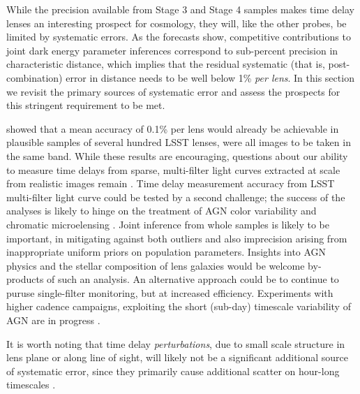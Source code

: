 While the precision available from Stage 3 and Stage 4 samples makes
time delay lenses an interesting prospect for cosmology, they will, like
the other probes, be limited by systematic errors. As the forecasts
show, competitive contributions to joint dark energy parameter
inferences correspond to sub-percent precision in characteristic
distance, which implies that the residual systematic (that is,
post-combination) error in  distance needs to be well below 1\% {\it per
lens}. In this section we revisit the primary sources of systematic
error and  assess the prospects for this stringent requirement to be
met.

\citet{TDC1} showed that a mean accuracy of 0.1\% per lens would already
be achievable in plausible samples of several hundred LSST lenses, were
all images to be taken in the same band.
While these results are encouraging, questions
about our ability to measure time delays from sparse, multi-filter light
curves extracted at scale from realistic images remain
\citep{TCM13}.
Time delay measurement accuracy from  LSST multi-filter
light curve could be tested by a second challenge; the success of the
analyses is likely to hinge on the treatment of AGN color variability
\citep[see e.g.\ ][and references therein]{SunEtal2014}
and chromatic  microelensing
\citep[see e.g.][and references therein]{HainlineEtal2013}.
Joint inference from whole samples is likely to
be important, in mitigating against both outliers and also imprecision
arising from inappropriate uniform priors on  population parameters.
Insights into AGN physics and the stellar composition  of lens galaxies
would be welcome by-products of such an analysis. An alternative approach
could be to continue to puruse single-filter monitoring, but at
increased efficiency. Experiments with higher cadence campaigns,
exploiting the short (sub-day) timescale variability of AGN are in
progress \citep[][F.~Courbin, priv.\ comm.]{BorosonEtal2016}.

It is worth noting that time delay {\it perturbations},  due to small
scale structure in lens plane or along line of sight, will likely not be
a significant  additional source of systematic error, since they
primarily cause additional  scatter on hour-long timescales
\citep{K+M09}.


